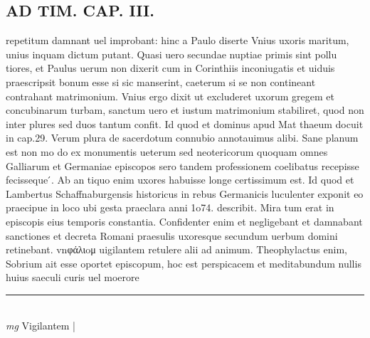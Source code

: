 \documentclass{article}
\begin{document}
\begin{pages}
\section*{AD TIM. CAP. III. }
\marginpar{[ p.125 ]}\pstart repetitum damnant uel improbant: hinc a Paulo diserte Vnius uxoris maritum, unius inquam dictum putant. Quasi uero secundae nuptiae primis sint pollu tiores, et Paulus uerum non dixerit cum in Corinthiis inconiugatis et uiduis praescripsit bonum esse si sic manserint, caeterum si se non contineant contrahant matrimonium. Vnius ergo dixit ut excluderet uxorum gregem et concubinarum turbam, sanctum uero et iustum matrimonium stabiliret, quod non inter plures sed duos tantum confit. Id quod et dominus apud Mat thaeum docuit in cap.29. Verum plura de sacerdotum connubio annotauimus alibi. Sane planum est non mo do ex monumentis ueterum sed neotericorum quoquam omnes Galliarum et Germaniae episcopos sero tandem professionem coelibatus recepisse fecisseque ́. Ab an tiquo enim uxores habuisse longe certissimum est. Id quod et Lambertus Schaffnaburgensis historicus in rebus Germanicis luculenter exponit eo praecipue in loco ubi gesta praeclara anni 1o74. describit. Mira tum erat in episcopis eius temporis constantia. Confidenter enim et negligebant et damnabant sanctiones et decreta Romani praesulis uxoresque secundum uerbum domini retinebant. vnφάλιoμ uigilantem retulere alii ad animum. Theophylactus enim, Sobrium ait esse oportet episcopum, hoc est perspicacem et meditabundum nullis huius saeculi curis uel moerore  \pend
\vspace{0.5cm}\noindent
\vspace{0.2cm}\rule{1cm}{0.2pt}\\ 
\hspace{0.2cm}\textit{mg}
\footnotesize Vigilantem 
\normalsize| 

\end{pages}
\end{document}
